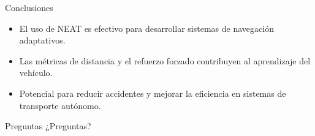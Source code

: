 \documentclass{beamer}
\begin{document}
\begin{frame}{Conclusiones}
    \begin{itemize}
        \item El uso de NEAT es efectivo para desarrollar sistemas de navegación adaptativos.
        \item Las métricas de distancia y el refuerzo forzado contribuyen al aprendizaje del vehículo.
        \item Potencial para reducir accidentes y mejorar la eficiencia en sistemas de transporte autónomo.
    \end{itemize}
\end{frame}

\begin{frame}{Preguntas}
    \centering
    {\Huge ¿Preguntas?}
\end{frame}
\end{document}
